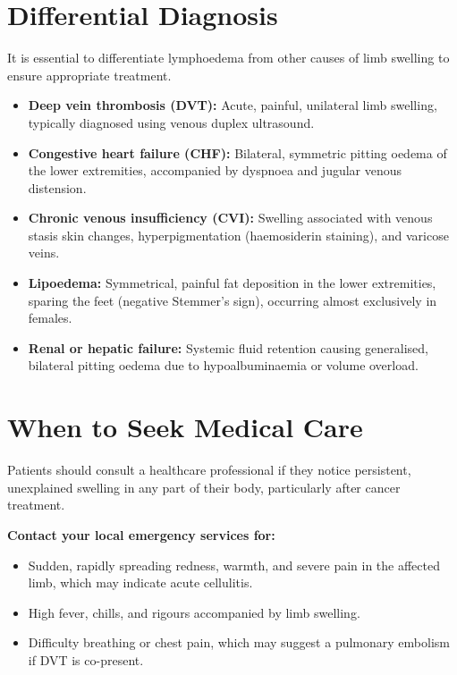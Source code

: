 \section*{Differential Diagnosis}
It is essential to differentiate lymphoedema from other causes of limb swelling to ensure appropriate treatment.
\begin{itemize}
    \item \textbf{Deep vein thrombosis (DVT):} Acute, painful, unilateral limb swelling, typically diagnosed using venous duplex ultrasound.
    \item \textbf{Congestive heart failure (CHF):} Bilateral, symmetric pitting oedema of the lower extremities, accompanied by dyspnoea and jugular venous distension.
    \item \textbf{Chronic venous insufficiency (CVI):} Swelling associated with venous stasis skin changes, hyperpigmentation (haemosiderin staining), and varicose veins.
    \item \textbf{Lipoedema:} Symmetrical, painful fat deposition in the lower extremities, sparing the feet (negative Stemmer's sign), occurring almost exclusively in females.
    \item \textbf{Renal or hepatic failure:} Systemic fluid retention causing generalised, bilateral pitting oedema due to hypoalbuminaemia or volume overload.
\end{itemize}

\section*{When to Seek Medical Care}
Patients should consult a healthcare professional if they notice persistent, unexplained swelling in any part of their body, particularly after cancer treatment.

\textbf{Contact your local emergency services for:}
\begin{itemize}
    \item Sudden, rapidly spreading redness, warmth, and severe pain in the affected limb, which may indicate acute cellulitis.
    \item High fever, chills, and rigours accompanied by limb swelling.
    \item Difficulty breathing or chest pain, which may suggest a pulmonary embolism if DVT is co-present.
\end{itemize}

